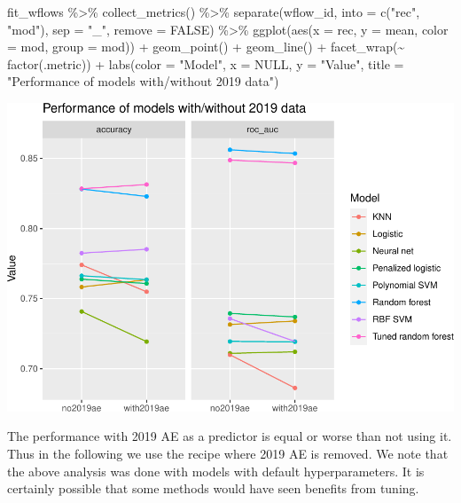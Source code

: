 \documentclass[
]{article}
\newenvironment{Shaded}{\begin{snugshade}}{\end{snugshade}}
\newcommand{\AttributeTok}[1]{\textcolor[rgb]{0.77,0.63,0.00}{#1}}
\newcommand{\ConstantTok}[1]{\textcolor[rgb]{0.00,0.00,0.00}{#1}}
\newcommand{\FunctionTok}[1]{\textcolor[rgb]{0.00,0.00,0.00}{#1}}
\newcommand{\NormalTok}[1]{#1}
\newcommand{\SpecialCharTok}[1]{\textcolor[rgb]{0.00,0.00,0.00}{#1}}
\newcommand{\StringTok}[1]{\textcolor[rgb]{0.31,0.60,0.02}{#1}}
\begin{document}
\begin{Shaded}
\begin{Highlighting}[]
\NormalTok{fit\_wflows }\SpecialCharTok{\%\textgreater{}\%}
  \FunctionTok{collect\_metrics}\NormalTok{() }\SpecialCharTok{\%\textgreater{}\%}
  \FunctionTok{separate}\NormalTok{(wflow\_id, }\AttributeTok{into =} \FunctionTok{c}\NormalTok{(}\StringTok{"rec"}\NormalTok{, }\StringTok{"mod"}\NormalTok{), }\AttributeTok{sep =} \StringTok{"\_"}\NormalTok{, }\AttributeTok{remove =} \ConstantTok{FALSE}\NormalTok{) }\SpecialCharTok{\%\textgreater{}\%}
  \FunctionTok{ggplot}\NormalTok{(}\FunctionTok{aes}\NormalTok{(}\AttributeTok{x =}\NormalTok{ rec, }\AttributeTok{y =}\NormalTok{ mean, }\AttributeTok{color =}\NormalTok{ mod, }\AttributeTok{group =}\NormalTok{ mod)) }\SpecialCharTok{+}
  \FunctionTok{geom\_point}\NormalTok{() }\SpecialCharTok{+} \FunctionTok{geom\_line}\NormalTok{() }\SpecialCharTok{+} \FunctionTok{facet\_wrap}\NormalTok{(}\SpecialCharTok{\textasciitilde{}} \FunctionTok{factor}\NormalTok{(.metric)) }\SpecialCharTok{+}
  \FunctionTok{labs}\NormalTok{(}\AttributeTok{color =} \StringTok{"Model"}\NormalTok{, }\AttributeTok{x =} \ConstantTok{NULL}\NormalTok{, }\AttributeTok{y =} \StringTok{"Value"}\NormalTok{, }
      \AttributeTok{title =} \StringTok{"Performance of models with/without 2019 data"}\NormalTok{)}
\end{Highlighting}
\end{Shaded}

\includegraphics{figures/report/fig-unnamed-chunk-18-1.pdf}

The performance with 2019 AE as a predictor is equal or worse than not
using it. Thus in the following we use the recipe where 2019 AE is
removed. We note that the above analysis was done with models with
default hyperparameters. It is certainly possible that some methods
would have seen benefits from tuning.
\end{document}
